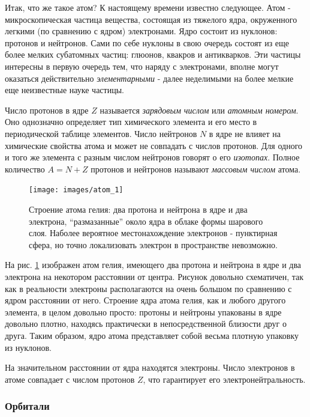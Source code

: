 Итак, что же такое атом? К настоящему времени известно следующее.
Атом - микроскопическая частица вещества, состоящая из тяжелого ядра, окруженного легкими (по сравнению с ядром) электронами.
Ядро состоит из нуклонов: протонов и нейтронов.
Сами по себе нуклоны в свою очередь состоят из еще более мелких субатомных частиц: глюонов, квакров и антикварков.
Эти частицы интересны в первую очередь тем, что наряду с электронами, вполне могут оказаться действительно \textit{элементарными} - далее неделимыми на более мелкие еще неизвестные науке частицы.

Число протонов в ядре $Z$ называется \textit{зарядовым числом} или \textit{атомным номером}.
Оно однозначно определяет тип химического элемента и его место в периодической таблице элементов. 
Число нейтронов $N$ в ядре не влияет на химические свойства атома и может не совпадать с числов протонов.
Для одного и того же элемента с разным числом нейтронов говорят о его \textit{изотопах}.
Полное количество $A = N + Z$ протонов и нейтронов называют \textit{массовым числом} атома.

\begin{figure}[t!]
   \centering
   \texttt{[image: images/atom\_1]}
   \caption{Строение атома гелия: два протона и нейтрона в ядре и два электрона, ``размазанные'' около ядра в облаке формы шарового слоя. Наболее вероятное местонахождение электронов - пунктирная сфера, но точно локализовать электрон в пространстве невозможно.}
   \label{fig:atom_1}
\end{figure}

На рис. \ref{fig:atom_1} изображен атом гелия, имеющего два протона и нейтрона в ядре и два электрона на некотором расстоянии от центра.
Рисунок довольно схематичен, так как в реальности электроны располагаются на очень большом по сравнению с ядром расстоянии от него.
Строение ядра атома гелия, как и любого другого элемента, в целом довольно просто: протоны и нейтроны упакованы в ядре довольно плотно, находясь практически в непосредственной близости друг о друга.
Таким образом, ядро атома представляет собой весьма плотную упаковку из нуклонов.

На значительном расстоянии от ядра находятся электроны.
Число электронов в атоме совпадает с числом протонов $Z$, что гарантирует его электронейтральность.

\subsubsection*{Орбитали}

